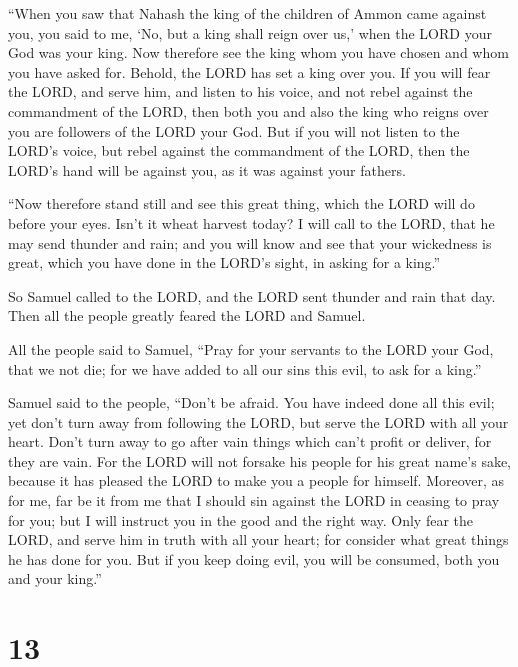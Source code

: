  ``When you saw that Nahash the king of the children of
Ammon came against you, you said to me, `No, but a king shall reign over
us,' when the LORD your God was your king.  Now therefore
see the king whom you have chosen and whom you have asked for. Behold,
the LORD has set a king over you.  If you will fear the
LORD, and serve him, and listen to his voice, and not rebel against the
commandment of the LORD, then both you and also the king who reigns over
you are followers of the LORD your God.  But if you will
not listen to the LORD's voice, but rebel against the commandment of the
LORD, then the LORD's hand will be against you, as it was against your
fathers.

 ``Now therefore stand still and see this great thing,
which the LORD will do before your eyes.  Isn't it wheat
harvest today? I will call to the LORD, that he may send thunder and
rain; and you will know and see that your wickedness is great, which you
have done in the LORD's sight, in asking for a king.''

 So Samuel called to the LORD, and the LORD sent thunder
and rain that day. Then all the people greatly feared the LORD and
Samuel.

 All the people said to Samuel, ``Pray for your servants
to the LORD your God, that we not die; for we have added to all our sins
this evil, to ask for a king.''

 Samuel said to the people, ``Don't be afraid. You have
indeed done all this evil; yet don't turn away from following the LORD,
but serve the LORD with all your heart.  Don't turn away
to go after vain things which can't profit or deliver, for they are
vain.  For the LORD will not forsake his people for his
great name's sake, because it has pleased the LORD to make you a people
for himself.  Moreover, as for me, far be it from me that
I should sin against the LORD in ceasing to pray for you; but I will
instruct you in the good and the right way.  Only fear
the LORD, and serve him in truth with all your heart; for consider what
great things he has done for you.  But if you keep doing
evil, you will be consumed, both you and your king.''

\hypertarget{section-12}{%
\section{13}\label{section-12}}

